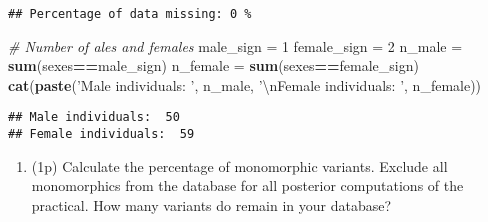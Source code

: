 \documentclass[
]{article}
\newenvironment{Shaded}{\begin{snugshade}}{\end{snugshade}}
\newcommand{\CharTok}[1]{\textcolor[rgb]{0.31,0.60,0.02}{#1}}
\newcommand{\CommentTok}[1]{\textcolor[rgb]{0.56,0.35,0.01}{\textit{#1}}}
\newcommand{\DecValTok}[1]{\textcolor[rgb]{0.00,0.00,0.81}{#1}}
\newcommand{\KeywordTok}[1]{\textcolor[rgb]{0.13,0.29,0.53}{\textbf{#1}}}
\newcommand{\NormalTok}[1]{#1}
\newcommand{\OperatorTok}[1]{\textcolor[rgb]{0.81,0.36,0.00}{\textbf{#1}}}
\newcommand{\StringTok}[1]{\textcolor[rgb]{0.31,0.60,0.02}{#1}}
\providecommand{\tightlist}{%
  \setlength{\itemsep}{0pt}\setlength{\parskip}{0pt}}
\begin{document}
\begin{verbatim}
## Percentage of data missing: 0 %
\end{verbatim}

\begin{Shaded}
\begin{Highlighting}[]
\CommentTok{# Number of ales and females}
\NormalTok{male_sign =}\StringTok{ }\DecValTok{1}
\NormalTok{female_sign =}\StringTok{ }\DecValTok{2}
\NormalTok{n_male =}\StringTok{ }\KeywordTok{sum}\NormalTok{(sexes}\OperatorTok{==}\NormalTok{male_sign)}
\NormalTok{n_female =}\StringTok{ }\KeywordTok{sum}\NormalTok{(sexes}\OperatorTok{==}\NormalTok{female_sign)}
\KeywordTok{cat}\NormalTok{(}\KeywordTok{paste}\NormalTok{(}\StringTok{'Male individuals: '}\NormalTok{, n_male, }\StringTok{'}\CharTok{\textbackslash{}n}\StringTok{Female individuals: '}\NormalTok{, n_female))}
\end{Highlighting}
\end{Shaded}

\begin{verbatim}
## Male individuals:  50 
## Female individuals:  59
\end{verbatim}

\begin{enumerate}
\def\labelenumi{\arabic{enumi}.}
\setcounter{enumi}{3}
\tightlist
\item
  (1p) Calculate the percentage of monomorphic variants. Exclude all
  monomorphics from the database for all posterior computations of the
  practical. How many variants do remain in your database?
\end{enumerate}
\end{document}
